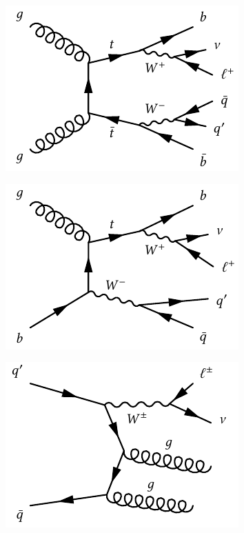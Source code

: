 \begin{figure}
	\centering
	\begin{subfigure}[b]{0.3\linewidth}
		\centering\includegraphics[width=\textwidth]{ttbar}
		\caption{\label{fig:ttbar}}
	\end{subfigure}\quad
		\begin{subfigure}[b]{0.3\linewidth}
		\centering\includegraphics[width=\textwidth]{singletop}
		\caption{\label{fig:singletop}}
	\end{subfigure}\quad
	\begin{subfigure}[b]{0.3\linewidth}
		\centering\includegraphics[width=\textwidth]{wjets}

\end{subfigure}
\end{figure}
